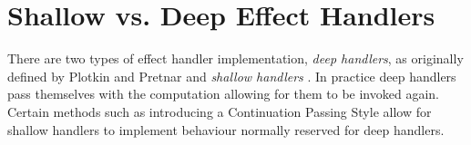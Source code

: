 \documentclass[logo,bsc,singlespacing,parskip]{infthesis}
\begin{document}











\section{Shallow vs. Deep Effect Handlers}

There are two types of effect handler implementation, \emph{deep handlers}, as
originally defined by Plotkin and Pretnar \cite{plotkin2009handlers} and
\emph{shallow handlers} \cite{hillerstrom2018shallow}. In practice deep handlers
pass themselves with the computation allowing for them to be invoked again.
Certain methods such as introducing a Continuation Passing Style allow for
shallow handlers to implement behaviour normally reserved for deep handlers.
\end{document}
